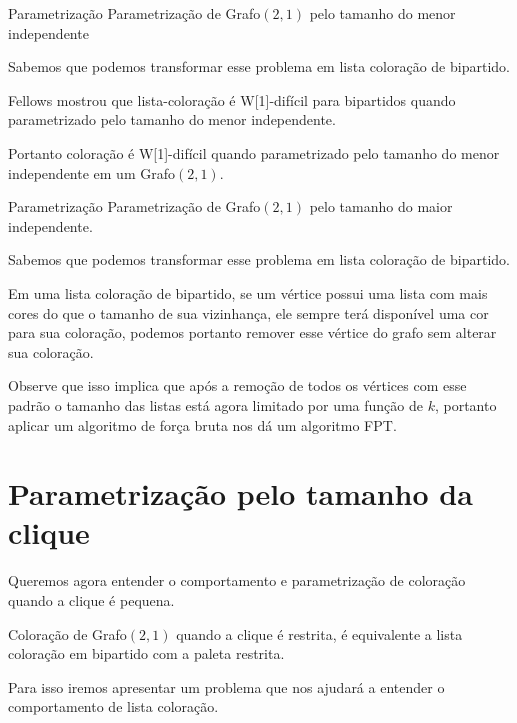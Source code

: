 \documentclass[9pt, compress]{beamer}
\newcommand{\?}{\textcolor{warn}{\textit{?}}}
\begin{document}
    \begin{frame}{Parametrização}
      \large{Parametrização de Grafo$(2,1)$ pelo tamanho do menor independente}
      \normalsize\newline\newline
            
      Sabemos que podemos transformar esse problema em lista coloração de bipartido.
      
      Fellows mostrou que lista-coloração é W[1]-difícil para bipartidos quando parametrizado pelo tamanho do menor independente.
      
      Portanto coloração é W[1]-difícil quando parametrizado pelo tamanho do menor independente em um Grafo$(2,1)$.
    \end{frame}
    \begin{frame}{Parametrização}
    \large{Parametrização de Grafo$(2,1)$ pelo tamanho do maior independente.}
      \normalsize\newline\newline
            
      Sabemos que podemos transformar esse problema em lista coloração de bipartido.
      
      Em uma lista coloração de bipartido, se um vértice possui uma lista com mais cores do que o tamanho de sua vizinhança, ele sempre terá disponível uma cor para sua coloração, podemos portanto remover esse vértice do grafo sem alterar sua coloração.
      
      Observe que isso implica que após a remoção de todos os vértices com esse padrão o tamanho das listas está agora limitado por uma função de $k$, portanto aplicar um algoritmo de força bruta nos dá um algoritmo FPT.
     \end{frame}
     
    \section{Parametrização pelo tamanho da clique}
     \begin{frame}
       Queremos agora entender o comportamento e parametrização de coloração quando a clique é pequena.
       
       Coloração de Grafo$(2,1)$ quando a clique é restrita, é equivalente a lista coloração em bipartido com a paleta restrita.
       
       Para isso iremos apresentar um problema que nos ajudará a entender o comportamento de lista coloração.
     \end{frame}
    
\end{document}
